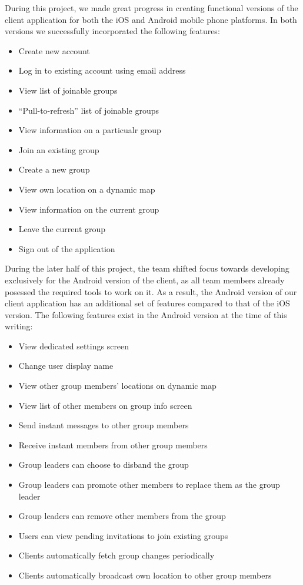 During this project, we made great progress in creating functional versions of
the client application for both the iOS and Android mobile phone platforms.
In both versions we successfully incorporated the following features:

\begin{itemize}
	\item Create new account
	\item Log in to existing account using email address
	\item View list of joinable groups
	\item ``Pull-to-refresh'' list of joinable groups
	\item View information on a particualr group
	\item Join an existing group
	\item Create a new group
	\item View own location on a dynamic map
	\item View information on the current group
	\item Leave the current group
	\item Sign out of the application
\end{itemize}

During the later half of this project, the team shifted focus towards developing
exclusively for the Android version of the client, as all team members already
posessed the required tools to work on it. As a result, the Android version of
our client application has an additional set of features compared to that of the
iOS version. The following features exist in the Android version at the time of
this writing:

\begin{itemize}
	\item View dedicated settings screen
	\item Change user display name
	\item View other group members' locations on dynamic map
	\item View list of other members on group info screen
	\item Send instant messages to other group members
	\item Receive instant members from other group members
	\item Group leaders can choose to disband the group
	\item Group leaders can promote other members to replace them as the group leader
	\item Group leaders can remove other members from the group
	\item Users can view pending invitations to join existing groups
	\item Clients automatically fetch group changes periodically
	\item Clients automatically broadcast own location to other group members
\end{itemize}

